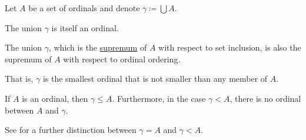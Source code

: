 \begin{proposition}\label{thm:union_of_set_of_ordinals}
  Let \( A \) be a set of ordinals and denote \( \gamma \coloneqq \bigcup A \).

  \begin{thmenum}
     The union \( \gamma \) is itself an ordinal.

     The union \( \gamma \), which is the \hyperref[def:poset_extremal_points/supremum_and_infimum]{supremum} of \( A \) with respect to set inclusion, is also the supremum of \( A \) with respect to ordinal ordering.

    That is, \( \gamma \) is the smallest ordinal that is not smaller than any member of \( A \).

     If \( A \) is an ordinal, then \( \gamma \leq A \). Furthermore, in the case \( \gamma < A \), there is no ordinal between \( A \) and \( \gamma \).

    See  for a further distinction between \( \gamma = A \) and \( \gamma < A \).
  \end{thmenum}
\end{proposition}
